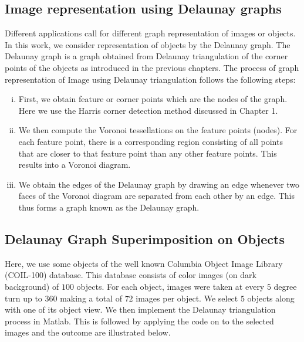 \documentclass[10pt,a4paper]{article}
\begin{document}
\subsection{Image representation using Delaunay graphs} 
Different applications call for different graph representation of images or objects. In this work, we consider representation of objects by the Delaunay graph. The Delaunay graph is a graph obtained from Delaunay triangulation of the corner points of the objects as introduced in the previous chapters. The process of graph representation of Image using Delaunay triangulation follows the following steps:
\begin{enumerate}[i)]
	\item First, we obtain feature or corner points which are the nodes of the graph. Here we use the Harris corner detection method discussed in Chapter 1.
	\item  We then compute the Voronoi tessellations on the feature points (nodes). For each feature point, there is a corresponding region consisting of all points that are closer to that feature point than any other feature points. This results into a Voronoi diagram.
	\item We obtain the edges of the Delaunay graph by drawing an edge whenever two faces of the Voronoi diagram are separated from each other by an edge. This thus forms a graph known as the Delaunay graph.
\end{enumerate}

\subsection{Delaunay Graph Superimposition on Objects }
Here, we use some objects of the well known Columbia Object Image Library (COIL-100) database. This database consists of color images (on dark background) of $100$ objects. For each object, images were taken at every $5$ degree turn up to $360$ making a total of $72$ images per object. 
We select $5$ objects along with one of its object view. We then implement the Delaunay triangulation process in Matlab. This is followed by applying the code on to the selected images and the outcome are illustrated below.
\end{document}
